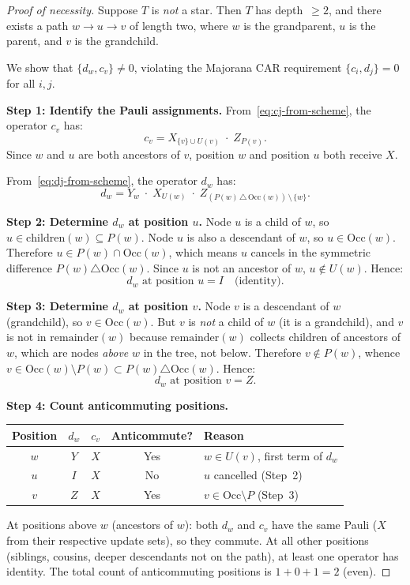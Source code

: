 \begin{proof}[Proof of necessity]
Suppose $T$ is \emph{not} a star.  Then $T$ has depth~$\ge 2$, and
there exists a path $w \to u \to v$ of length two, where $w$ is the
grandparent, $u$ is the parent, and $v$ is the grandchild.

We show that $\{d_w, c_v\} \neq 0$, violating the Majorana CAR
requirement $\{c_i, d_j\} = 0$ for all $i, j$.

\textbf{Step 1: Identify the Pauli assignments.}
From~\eqref{eq:cj-from-scheme}, the operator $c_v$ has:
\begin{equation}
  c_v = X_{\{v\} \cup U(v)} \;\cdot\; Z_{P(v)}.
  \label{eq:cv-explicit}
\end{equation}
Since $w$ and $u$ are both ancestors of $v$, position $w$ and position
$u$ both receive $X$.

From~\eqref{eq:dj-from-scheme}, the operator $d_w$ has:
\begin{equation}
  d_w = Y_w \;\cdot\; X_{U(w)} \;\cdot\;
    Z_{(P(w)\,\triangle\,\mathrm{Occ}(w))\,\setminus\,\{w\}}.
  \label{eq:dw-explicit}
\end{equation}

\textbf{Step 2: Determine $d_w$ at position $u$.}
Node $u$ is a child of $w$, so $u \in \text{children}(w) \subseteq
P(w)$.  Node $u$ is also a descendant of $w$, so $u \in \mathrm{Occ}(w)$.
Therefore $u \in P(w) \cap \mathrm{Occ}(w)$, which means $u$ cancels in
the symmetric difference $P(w) \triangle \mathrm{Occ}(w)$.  Since $u$ is
not an ancestor of $w$, $u \notin U(w)$.  Hence:
\[
  d_w \text{ at position } u = I \quad\text{(identity)}.
\]

\textbf{Step 3: Determine $d_w$ at position $v$.}
Node $v$ is a descendant of $w$ (grandchild), so
$v \in \mathrm{Occ}(w)$.  But $v$ is \emph{not} a child of $w$ (it is
a grandchild), and $v$ is not in $\text{remainder}(w)$ because
$\text{remainder}(w)$ collects children of ancestors of $w$, which are
nodes \emph{above} $w$ in the tree, not below.  Therefore
$v \notin P(w)$, whence $v \in \mathrm{Occ}(w) \setminus P(w) \subset
P(w) \triangle \mathrm{Occ}(w)$.  Hence:
\[
  d_w \text{ at position } v = Z.
\]

\textbf{Step 4: Count anticommuting positions.}
\begin{center}
\begin{tabular}{@{}ccccl@{}}
\toprule
Position & $d_w$ & $c_v$ & Anticommute? & Reason \\
\midrule
$w$ & $Y$ & $X$ & Yes & $w \in U(v)$, first term of $d_w$ \\
$u$ & $I$ & $X$ & No  & $u$ cancelled (Step~2) \\
$v$ & $Z$ & $X$ & Yes & $v \in \mathrm{Occ} \setminus P$ (Step~3) \\
\bottomrule
\end{tabular}
\end{center}
At positions above $w$ (ancestors of $w$): both $d_w$ and $c_v$ have
the same Pauli ($X$ from their respective update sets), so they
commute.  At all other positions (siblings, cousins, deeper
descendants not on the path), at least one operator has identity.  The
total count of anticommuting positions is $1 + 0 + 1 = 2$ (even).


\end{proof}
